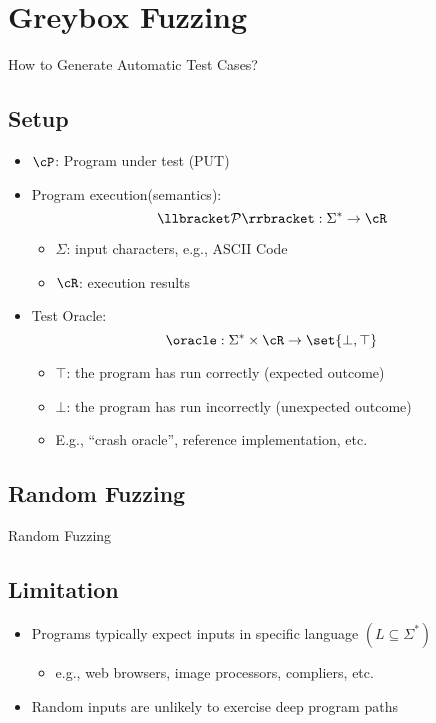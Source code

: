 
\section{Greybox Fuzzing}
How to Generate Automatic Test Cases?
\subsection{Setup}
\begin{itemize}
	\item $\cP$: Program under test (PUT)
	\item Program execution(semantics): \[
	\llbracket\mathcal{P}\rrbracket:\Sigma^*\to\cR
	\] \begin{itemize}
		\item $\Sigma$: input characters, e.g., ASCII Code
		\item $\cR$: execution results
	\end{itemize}
	\item Test Oracle: \[
	\oracle:\Sigma^*\times\cR\to\set{\bot,\top}
	\]
	\begin{itemize}
		\item $\top$: the program has run correctly (expected outcome)
		\item $\bot$: the program has run incorrectly (unexpected outcome)
		\item E.g., ``crash oracle'', reference implementation, etc. 
	\end{itemize}
\end{itemize}

\subsection{Random Fuzzing}
\begin{algorithm}\DontPrintSemicolon
	\caption{Random Fuzzing}
\end{algorithm}
	
\newpage
\subsection{Limitation}
\begin{itemize}
	\item Programs typically expect inputs in specific language $(L\subseteq \Sigma^*)$
	\begin{itemize}
		\item e.g., web browsers, image processors, compliers, etc.
	\end{itemize}
	\item Random inputs are unlikely to exercise deep program paths
\end{itemize}


